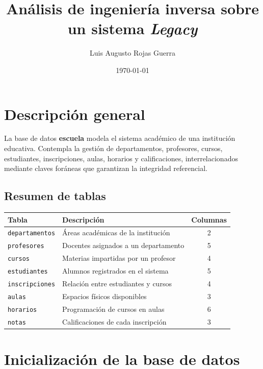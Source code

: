 \documentclass[12pt,a4paper]{article}
\title{Análisis de ingeniería inversa sobre un sistema \textit{Legacy}}
\author{Luis Augusto Rojas Guerra}
\date{\today}
\begin{document}
\maketitle
\tableofcontents
\newpage

\section{Descripción general}

La base de datos \textbf{escuela} modela el sistema académico de una
institución educativa. Contempla la gestión de departamentos,
profesores, cursos, estudiantes, inscripciones, aulas, horarios y
calificaciones, interrelacionados mediante claves foráneas que
garantizan la integridad referencial.

\subsection{Resumen de tablas}

\begin{center}
\begin{tabular}{llc}
  \hline
  \textbf{Tabla} & \textbf{Descripción} & \textbf{Columnas} \\
  \hline
  \texttt{departamentos} & Áreas académicas de la institución   & 2 \\
  \texttt{profesores}    & Docentes asignados a un departamento       & 5 \\
  \texttt{cursos}        & Materias impartidas por un profesor        & 4 \\
  \texttt{estudiantes}   & Alumnos registrados en el sistema          & 5 \\
  \texttt{inscripciones} & Relación entre estudiantes y cursos      & 4 \\
  \texttt{aulas}         & Espacios físicos disponibles             & 3 \\
  \texttt{horarios}      & Programación de cursos en aulas          & 6 \\
  \texttt{notas}         & Calificaciones de cada inscripción       & 3 \\
  \hline
\end{tabular}
\end{center}

\section{Inicialización de la base de datos}
\end{document}
